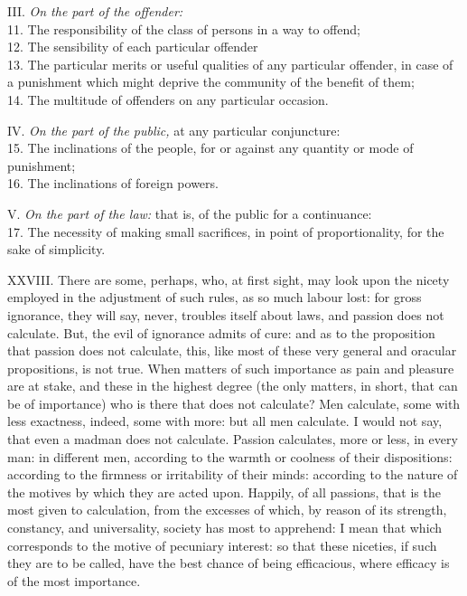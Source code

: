 \documentclass[12pt]{report}
\begin{document}
III. \emph{On the part of the offender:}\\
11. The responsibility of the class of persons in a way to offend;\\
12. The sensibility of each particular offender\\
13. The particular merits or useful qualities of any particular
offender, in case of a punishment which might deprive the community of
the benefit of them;\\
14. The multitude of offenders on any particular occasion.

IV. \emph{On the part of the public,} at any particular conjuncture:\\
15. The inclinations of the people, for or against any quantity or mode
of punishment;\\
16. The inclinations of foreign powers.

V. \emph{On the part of the law:} that is, of the public for a
continuance:\\
17. The necessity of making small sacrifices, in point of
proportionality, for the sake of simplicity.

XXVIII. There are some, perhaps, who, at first sight, may look upon the
nicety employed in the adjustment of such rules, as so much labour lost:
for gross ignorance, they will say, never, troubles itself about laws,
and passion does not calculate. But, the evil of ignorance admits of
cure: and as to the proposition that passion does not calculate, this,
like most of these very general and oracular propositions, is not true.
When matters of such importance as pain and pleasure are at stake, and
these in the highest degree (the only matters, in short, that can be of
importance) who is there that does not calculate? Men calculate, some
with less exactness, indeed, some with more: but all men calculate. I
would not say, that even a madman does not calculate. Passion
calculates, more or less, in every man: in different men, according to
the warmth or coolness of their dispositions: according to the firmness
or irritability of their minds: according to the nature of the motives
by which they are acted upon. Happily, of all passions, that is the most
given to calculation, from the excesses of which, by reason of its
strength, constancy, and universality, society has most to apprehend: I
mean that which corresponds to the motive of pecuniary interest: so that
these niceties, if such they are to be called, have the best chance of
being efficacious, where efficacy is of the most importance.
\end{document}
